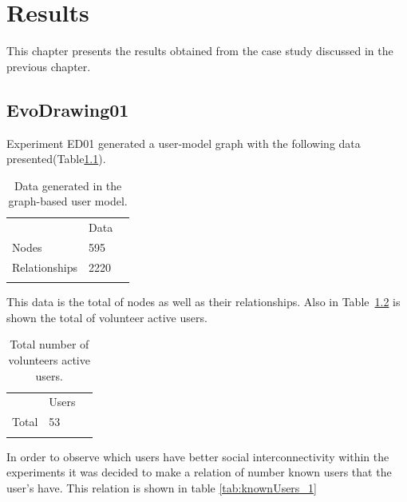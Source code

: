 \chapter{Results} \label{sec:6} This chapter presents the results obtained from
the case study discussed in the previous chapter.

\section{EvoDrawing01}

Experiment ED01 generated a user-model graph with the following data
presented(Table\ref{tab:dataGenerated_1}).

\begin{table}
\small
\caption{Data generated in the graph-based user model.}
\label{tab:dataGenerated_1}
\centering
\small
\begin{tabular}{p{3cm} p{3cm} p{3cm} }
\hline\noalign{\smallskip}
  & Data &  \\
\noalign{\smallskip}\hline\noalign{\smallskip}
\small{Nodes} & \small{595} & \\ \hline
\small{Relationships} & \small{2220} & \\ \hline

\noalign{\smallskip}\hline
\end{tabular}
\end{table}


This data is the total of nodes as well as their relationships. Also in
Table~\ref{tab:totalUsers_12} is shown the total of volunteer active users.

\begin{table}
\small
\caption{Total number of volunteers active users.}
\label{tab:totalUsers_12}
\centering
\small
\begin{tabular}{p{3cm} p{3cm} p{3cm} }
\hline\noalign{\smallskip}
  & Users &  \\
\noalign{\smallskip}\hline\noalign{\smallskip}
\small{Total } & \small{53} & \\ \hline
\noalign{\smallskip}\hline
\end{tabular}
\end{table}

In order to observe which users have better social interconnectivity within the
experiments it was decided to make a relation of number known users that the
user’s have. This relation is shown in table \ref{tab:knownUsers_1}

